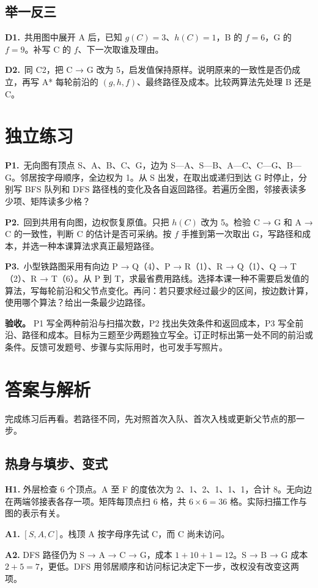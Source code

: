 \documentclass[UTF8,a4paper,11pt]{ctexart}
\newcommand{\CompactQuestion}[2]{\par\noindent\textbf{#1.}\ #2\par\vspace{.8em}}
\begin{document}
\subsection{举一反三}
\CompactQuestion{D1}{共用图中展开 A 后，已知 $g(C)=3$、$h(C)=1$，B 的 $f=6$，G 的 $f=9$。补写 C 的 $f$、下一次取谁及理由。}
\CompactQuestion{D2}{同 C2，把 C → G 改为 5，启发值保持原样。说明原来的一致性是否仍成立，再写 A* 每轮前沿的 $(g,h,f)$、最终路径及成本。比较两算法先处理 B 还是 C。}
\clearpage
\section{独立练习}
\CompactQuestion{P1}{无向图有顶点 S、A、B、C、G，边为 S—A、S—B、A—C、C—G、B—G。邻居按字母顺序，全边权为 1。从 S 出发，在取出或递归到达 G 时停止，分别写 BFS 队列和 DFS 路径栈的变化及各自返回路径。若遍历全图，邻接表读多少项、矩阵读多少格？}
\CompactQuestion{P2}{回到共用有向图，边权恢复原值。只把 $h(C)$ 改为 5。检验 C → G 和 A → C 的一致性，判断 C 的估计是否可采纳。按 $f$ 手推到第一次取出 G，写路径和成本，并选一种本课算法求真正最短路径。}
\CompactQuestion{P3}{小型铁路图采用有向边 P → Q（4）、P → R（1）、R → Q（1）、Q → T（2）、R → T（6）。从 P 到 T，求最省费用路线。选择本课一种不需要启发值的算法，写每轮前沿和父节点变化。再问：若只要求经过最少的区间，按边数计算，使用哪个算法？给出一条最少边路径。}
\textbf{验收。} P1 写全两种前沿与扫描次数，P2 找出失效条件和返回成本，P3 写全前沿、路径和成本。目标为三题至少两题独立写全。订正时标出第一处不同的前沿或条件。反馈可发题号、步骤与实际用时，也可发手写照片。

\clearpage
\section{答案与解析}
完成练习后再看。若路径不同，先对照首次入队、首次入栈或更新父节点的那一步。

\subsection{热身与填步、变式}
\textbf{H1.} 外层检查 6 个顶点。A 至 F 的度依次为 2、1、2、1、1、1，合计 8。无向边在两端邻接表各存一项。矩阵每顶点扫 6 格，共 $6\times6=36$ 格。实际扫描工作与图的表示有关。

\textbf{A1.} $[S,A,C]$。栈顶 A 按字母序先试 C，而 C 尚未访问。

\textbf{A2.} DFS 路径仍为 S → A → C → G，成本 $1+10+1=12$。S → B → G 成本 $2+5=7$，更低。DFS 用邻居顺序和访问标记决定下一步，改权没有改变这两项。
\end{document}
